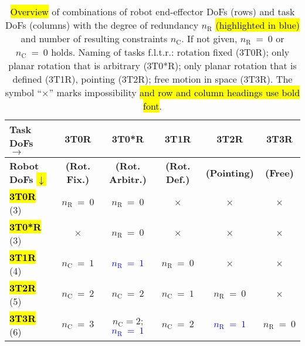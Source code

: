 \begin{table}[H]
  \newcommand{\no}{{\color{red}$\boldsymbol\times$}}
  \caption[Overview of combinations of robot end-effector DoFs and task DoFs]{\hl{Overview} %
    of combinations of robot end-effector DoFs (rows) and task DoFs (columns) with the degree of redundancy $n_\mathrm{R}$ \hl{(highlighted in blue)} and number of resulting constraints $n_\mathrm{C}$. If not given, $n_\mathrm{R}~{=}~0$ or $n_\mathrm{C}~{=}~0$ holds. Naming of tasks f.l.t.r.: rotation fixed (3T0R); {only} planar rotation {that is} arbitrary (3T0*R); only planar rotation {that is} defined (3T1R), pointing (3T2R); free motion in space (3T3R). The symbol ``\no'' marks impossibility \hl{and row and column headings use bold font}.}
  \label{tab:task_vs_robot_dof}
    \begin{tabularx}{\textwidth}{lCcCCC} 
      \toprule
      \textbf{Task DoFs} $\rightarrow$ & \textbf{3T0R}  & \textbf{3T0*R} & \textbf{3T1R}  & \textbf{3T2R}  & \textbf{3T3R}  \\ 
      \midrule
      \textbf{Robot DoFs} \hl{$\downarrow$} %
      & \textbf{(Rot. Fix.)}&\textbf{(Rot. Arbitr.)} & \textbf{(Rot. Def.)} & \textbf{(Pointing)} & \textbf{(Free)} \\
      \midrule
      \hl{\textbf{3T0R}} %
      (3)  & $n_\mathrm{R}~{=}~0$ & $n_\mathrm{R}~{=}~0$ &  \no & \no & \no  \\
      \hl{\textbf{3T0*R}} (3)  & \no & $n_\mathrm{R}~{=}~0$ &  \no & \no & \no  \\
      \hl{\textbf{3T1R}} (4)  & $n_\mathrm{C}~{=}~1$ & \textcolor{blue}{$n_\mathrm{R}~{=}~1$} & $n_\mathrm{R}~{=}~0$ & \no & \no \\
      \hl{ \textbf{3T2R}} (5)  & $n_\mathrm{C}~{=}~2$ & $n_\mathrm{C}~{=}~2$ & $n_\mathrm{C}~{=}~1$  & $n_\mathrm{R}~{=}~0$ &  \no \\
      \hl{\textbf{3T3R}} (6)  & $n_\mathrm{C}~{=}~3$ & $n_\mathrm{C}{=}2$; \textcolor{blue}{$n_\mathrm{R}~{=}~1$} & $n_\mathrm{C}~{=}~2$  &  \textcolor{blue}{$n_\mathrm{R}~{=}~1$} & $n_\mathrm{R}~{=}~0$ \\
      \bottomrule
    \end{tabularx}
\end{table}

